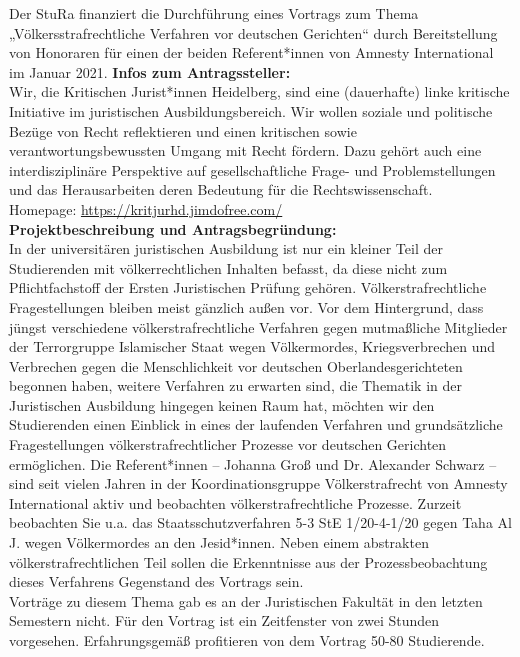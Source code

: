 {
    Der StuRa finanziert die Durchführung eines Vortrags zum Thema „Völkersstrafrechtliche Verfahren vor deutschen Gerichten“ durch Bereitstellung von Honoraren für einen der beiden Referent*innen von Amnesty International im Januar 2021.
}{
    \textbf{Infos zum Antragssteller:}\\
    Wir, die Kritischen Jurist*innen Heidelberg, sind eine (dauerhafte) linke kritische Initiative im juristischen Ausbildungsbereich. Wir wollen soziale und politische Bezüge von Recht reflektieren und einen kritischen sowie verantwortungsbewussten Umgang mit Recht fördern. Dazu gehört auch eine interdisziplinäre Perspektive auf gesellschaftliche Frage- und Problemstellungen und das Herausarbeiten deren Bedeutung für die Rechtswissenschaft.\\
    Homepage: \url{https://kritjurhd.jimdofree.com/}\\[1em]
    \textbf{Projektbeschreibung und Antragsbegründung:}\\
    In der universitären juristischen Ausbildung ist nur ein kleiner Teil der Studierenden mit völkerrechtlichen Inhalten befasst, da diese nicht zum Pflichtfachstoff der Ersten Juristischen Prüfung gehören. Völkerstrafrechtliche Fragestellungen bleiben meist gänzlich außen vor. Vor dem Hintergrund, dass jüngst verschiedene völkerstrafrechtliche Verfahren gegen mutmaßliche Mitglieder der Terrorgruppe Islamischer Staat wegen Völkermordes, Kriegsverbrechen und Verbrechen gegen die Menschlichkeit vor deutschen Oberlandesgerichteten begonnen haben, weitere Verfahren zu erwarten sind, die Thematik in der Juristischen Ausbildung hingegen keinen Raum hat, möchten wir den Studierenden einen Einblick in eines der laufenden Verfahren und grundsätzliche Fragestellungen völkerstrafrechtlicher Prozesse vor deutschen Gerichten ermöglichen. Die Referent*innen – Johanna Groß und Dr. Alexander Schwarz – sind seit vielen Jahren in der Koordinationsgruppe Völkerstrafrecht von Amnesty International aktiv und beobachten völkerstrafrechtliche Prozesse. Zurzeit beobachten Sie u.a. das Staatsschutzverfahren 5-3 StE 1/20-4-1/20 gegen Taha Al J. wegen Völkermordes an den Jesid*innen. Neben einem abstrakten völkerstrafrechtlichen Teil sollen die Erkenntnisse aus der Prozessbeobachtung dieses Verfahrens Gegenstand des Vortrags sein.\\
    Vorträge zu diesem Thema gab es an der Juristischen Fakultät in den letzten Semestern nicht. Für den Vortrag ist ein Zeitfenster von zwei Stunden vorgesehen. Erfahrungsgemäß profitieren von dem Vortrag 50-80 Studierende. \\
}
